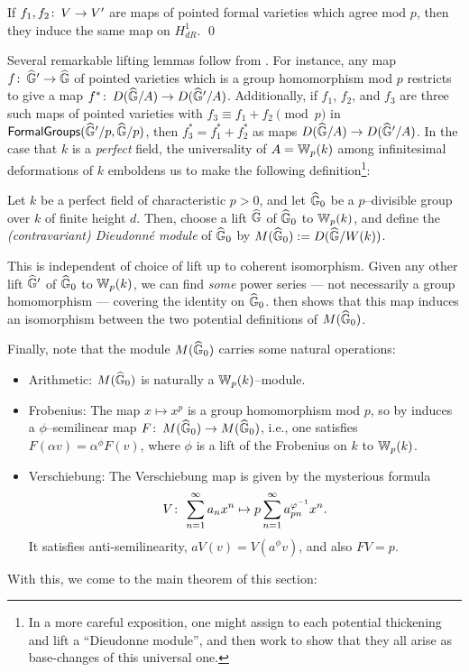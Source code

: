 \begin{corollary}[{$H^1_{dR}$ is ``crystalline''}]\label{H1dRIsCrystalline}
If $f_1, f_2\colon\thinspace V \to V'$ are maps of pointed formal varieties which agree mod $p$, then they induce the same map on $H^1_{dR}$. \qed
\end{corollary}

Several remarkable lifting lemmas follow from .  For instance, any map $f\colon\thinspace \widehat{\mathbb G}' \to \widehat{\mathbb G}$ of pointed varieties which is a group homomorphism mod $p$ restricts to give a map $f^*\colon\thinspace D(\widehat{\mathbb G}/A) \to D(\widehat{\mathbb G}'/A)$.  Additionally, if $f_1$, $f_2$, and $f_3$ are three such maps of pointed varieties with $f_3 \equiv f_1 + f_2 \pmod{p}$ in $\mathsf{FormalGroups}(\widehat{\mathbb G}'/p, \widehat{\mathbb G}/p)$, then $f_3^* = f_1^* + f_2^*$ as maps $D(\widehat{\mathbb G}/A) \to D(\widehat{\mathbb G}'/A)$.  In the case that $k$ is a \emph{perfect} field, the universality of $A = \mathbb W_p(k)$ among infinitesimal deformations of $k$ emboldens us to make the following definition\footnote{In a more careful exposition, one might assign to each potential thickening and lift a ``Dieudonne module'', and then work to show that they all arise as base-changes of this universal one.}:

\begin{definition}
Let $k$ be a perfect field of characteristic $p > 0$, and let $\widehat{\mathbb G}_0$ be a $p$--divisible group over $k$ of finite height $d$.  Then, choose a lift $\widehat{\mathbb G}$ of $\widehat{\mathbb G}_0$ to $\mathbb W_p(k)$, and define the \textit{(contravariant) Dieudonn\'e module} of $\widehat{\mathbb G}_0$ by $M(\widehat{\mathbb G}_0) := D(\widehat{\mathbb G} / W(k))$.
\end{definition}

\begin{remark}
This is independent of choice of lift up to coherent isomorphism.  Given any other lift $\widehat{\mathbb G}'$ of $\widehat{\mathbb G}_0$ to $\mathbb W_p(k)$, we can find \emph{some} power series --- not necessarily a group homomorphism --- covering the identity on $\widehat{\mathbb G}_0$.   then shows that this map induces an isomorphism between the two potential definitions of $M(\widehat{\mathbb G}_0)$.
\end{remark}

Finally, note that the module $M(\widehat{\mathbb G}_0)$ carries some natural operations:
\begin{itemize}
\item Arithmetic: $M(\widehat{\mathbb G}_0)$ is naturally a $\mathbb W_p(k)$--module.
\item Frobenius: The map $x \mapsto x^p$ is a group homomorphism mod $p$, so by  induces a $\phi$--semilinear map $F\colon\thinspace M(\widehat{\mathbb G}_0) \to M(\widehat{\mathbb G}_0)$, i.e., one satisfies $F(\alpha v) = \alpha^\phi F(v)$, where $\phi$ is a lift of the Frobenius on $k$ to $\mathbb W_p(k)$.
\item Verschiebung: The Verschiebung map is given by the mysterious formula \[V\colon\thinspace \sum_{n=1}^\infty a_n x^n \mapsto p \sum_{n=1}^\infty a_{pn}^{\varphi^{-1}} x^n.\] It satisfies anti-semilinearity, $aV(v) = V(a^\phi v)$, and also $FV = p$.
\end{itemize}
With this, we come to the main theorem of this section:

